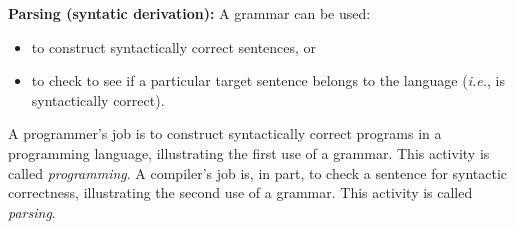 \begin{minipage}[t]{\sw}
\slidenumber
\LARGE
{\bf Parsing (syntatic derivation):}\exx
\emm{\Large\LightBox{\MYlon}}\exx
A grammar can be used:
\begin{itemize}
\itemsep 0ex
\item
  to construct syntactically correct sentences, or
\item
  to check to see if a particular target sentence belongs
  to the language ({\em i.e.}, is syntactically correct).
\end{itemize}
A programmer's job is to construct syntactically correct programs
in a programming language, illustrating the first use of a grammar.
This activity is called {\em programming}.\exx
A compiler's job is, in part,
to check a sentence for syntactic correctness,
illustrating the second use of a grammar.
This activity is called {\em parsing}.
\end{minipage}
\clearpage
